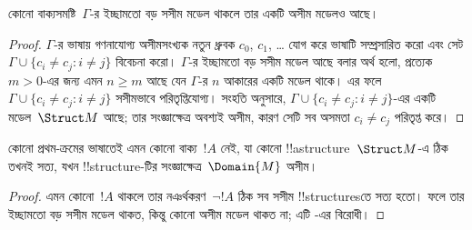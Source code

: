 \documentclass[../../../include/open-logic-section]{subfiles}
\begin{document}

\begin{thm}
 কোনো বাক্যসমষ্টি~$\Gamma$-র ইচ্ছামতো বড় সসীম মডেল
থাকলে তার একটি অসীম মডেলও আছে।
\end{thm}

\begin{proof}
$\Gamma$-র ভাষায় গণনাযোগ্য অসীমসংখ্যক নতুন ধ্রুবক $c_0$, $c_1$,
\dots{} যোগ করে ভাষাটি সম্প্রসারিত করো এবং সেট $\Gamma \cup \{c_i
\neq c_j : i \neq j\}$ বিবেচনা করো। $\Gamma$-র ইচ্ছামতো বড় সসীম
মডেল আছে বলার অর্থ হলো, প্রত্যেক $m >0$-এর জন্য এমন $n\ge m$ আছে যেন
$\Gamma$-র $n$ আকারের একটি মডেল থাকে। এর ফলে $\Gamma \cup \{c_i
\neq c_j : i \neq j\}$ সসীমভাবে পরিতৃপ্তিযোগ্য। সংহতি অনুসারে,
$\Gamma \cup \{c_i \neq c_j : i \neq j\}$-এর একটি মডেল~$\Struct M$
আছে; তার সংজ্ঞাক্ষেত্র অবশ্যই অসীম, কারণ সেটি সব অসমতা $c_i \neq c_j$
পরিতৃপ্ত করে।
\end{proof}

\begin{prop}
কোনো প্রথম-ক্রমের ভাষাতেই এমন কোনো বাক্য~$!A$ নেই, যা কোনো
!!a{structure}~$\Struct M$-এ ঠিক তখনই সত্য, যখন !!{structure}-টির
সংজ্ঞাক্ষেত্র~$\Domain{M}$ অসীম।
\end{prop}

\begin{proof}
এমন কোনো~$!A$ থাকলে তার নঞর্থকরণ~$\lnot !A$ ঠিক সব সসীম
!!{structure}sতে সত্য হতো। ফলে তার ইচ্ছামতো বড় সসীম মডেল থাকত, কিন্তু
কোনো অসীম মডেল থাকত না; এটি -এর বিরোধী।
\end{proof}
\end{document}
